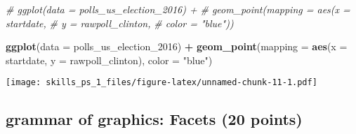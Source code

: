 \documentclass[
]{article}
\newenvironment{Shaded}{\begin{snugshade}}{\end{snugshade}}
\newcommand{\CommentTok}[1]{\textcolor[rgb]{0.56,0.35,0.01}{\textit{#1}}}
\newcommand{\DataTypeTok}[1]{\textcolor[rgb]{0.13,0.29,0.53}{#1}}
\newcommand{\DecValTok}[1]{\textcolor[rgb]{0.00,0.00,0.81}{#1}}
\newcommand{\KeywordTok}[1]{\textcolor[rgb]{0.13,0.29,0.53}{\textbf{#1}}}
\newcommand{\NormalTok}[1]{#1}
\newcommand{\OperatorTok}[1]{\textcolor[rgb]{0.81,0.36,0.00}{\textbf{#1}}}
\newcommand{\StringTok}[1]{\textcolor[rgb]{0.31,0.60,0.02}{#1}}
\begin{document}
\begin{enumerate}
\begin{Shaded}
\begin{Highlighting}[]
\CommentTok{# ggplot(data = polls_us_election_2016) + }
\CommentTok{#  geom_point(mapping = aes(x = startdate, }
\CommentTok{#                           y = rawpoll_clinton, }
\CommentTok{#                           color = "blue"))}

\KeywordTok{ggplot}\NormalTok{(}\DataTypeTok{data =}\NormalTok{ polls_us_election_}\DecValTok{2016}\NormalTok{) }\OperatorTok{+}\StringTok{ }
\StringTok{  }\KeywordTok{geom_point}\NormalTok{(}\DataTypeTok{mapping =} \KeywordTok{aes}\NormalTok{(}\DataTypeTok{x =}\NormalTok{ startdate, }
                           \DataTypeTok{y =}\NormalTok{ rawpoll_clinton),}
                           \DataTypeTok{color =} \StringTok{"blue"}\NormalTok{)}
\end{Highlighting}
\end{Shaded}

  \texttt{[image: skills\_ps\_1\_files/figure-latex/unnamed-chunk-11-1.pdf]}
\end{enumerate}

\hypertarget{grammar-of-graphics-facets-20-points}{%
\subsection{grammar of graphics: Facets (20
points)}\label{grammar-of-graphics-facets-20-points}}
\end{document}
